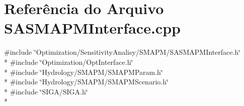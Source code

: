 \section{Referência do Arquivo S\+A\+S\+M\+A\+P\+M\+Interface.\+cpp}
\label{_s_a_s_m_a_p_m_interface_8cpp}
{\ttfamily \#include \char`\"{}Optimization/\+Sensitivity\+Analisy/\+S\+M\+A\+P\+M/\+S\+A\+S\+M\+A\+P\+M\+Interface.\+h\char`\"{}}\\*
{\ttfamily \#include \char`\"{}Optimization/\+Opt\+Interface.\+h\char`\"{}}\\*
{\ttfamily \#include \char`\"{}Hydrology/\+S\+M\+A\+P\+M/\+S\+M\+A\+P\+M\+Param.\+h\char`\"{}}\\*
{\ttfamily \#include \char`\"{}Hydrology/\+S\+M\+A\+P\+M/\+S\+M\+A\+P\+M\+Scenario.\+h\char`\"{}}\\*
{\ttfamily \#include \char`\"{}S\+I\+G\+A/\+S\+I\+G\+A.\+h\char`\"{}}\\*
